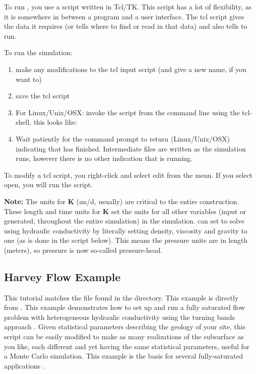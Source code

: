 To run \parflow{}, you use a script written in Tcl/TK.  This script has a lot of flexibility, as it is somewhere in between a program 
and a user interface.  The tcl script gives \parflow{} the data it requires (or tells \parflow{} where to find or read in that data) 
and also tells \parflow{} to run.

To run the simulation:
\begin{enumerate}
\item{make any modifications to the tcl input script (and give a new name, if you want to)}
\item{save the tcl script}
\item{For Linux/Unix/OSX: invoke the script from the command line using the tcl-shell, this looks like: }
\item{Wait patiently for the command prompt to return (Linux/Unix/OSX) indicating that \parflow{} has finished.  Intermediate files are written as the simulation runs, however there is no other indication that \parflow{} is running.}
\end{enumerate}

To modify a tcl script, you right-click and select edit from the menu.  If you select open, you will run the script.

{\bf Note:}  The units for {\bf K} (\i{m/d}, usually) are critical to the entire construction.  
These length and time units for {\bf K} set the units for all other variables (input or generated, 
throughout the entire simulation) in the simulation.  \parflow{} can set to solve using hydraulic 
conductivity by literally setting density, viscosity and gravity to one (as is done in the script below).  
This means the pressure units are in length (meters), so pressure is now so-called pressure-head.

\subsection{Harvey Flow Example}
\label{Harvey Flow Example}

This tutorial matches the  file found in the  directory.  This example is directly from \cite{MWH07}.  
This example demonstrates how to set up and run a fully saturated flow problem with heterogeneous hydraulic conductivity using 
the turning bands approach \cite{TAG89}. Given statistical parameters describing the geology of your site, 
this script can be easily modified to make as many realizations 
of the subsurface as you like, each different and yet having the same statistical parameters, useful for a Monte Carlo simulation.  This example
is the basis for several fully-saturated \parflow{} applications \cite{Siirila12a,Siirila12b,SNSMM10,Atchley13a,Atchley13b,Cui14}.

